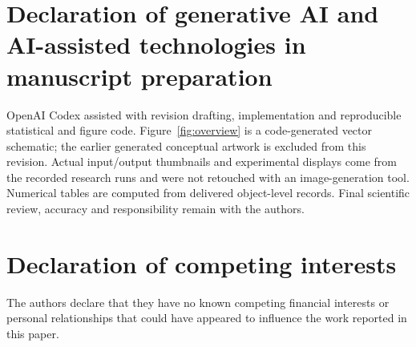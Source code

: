 \documentclass[times,twocolumn,final]{elsarticle}
\providecommand{\DIFadd}[1]{{\protect\color{blue} \sf #1}} %
\providecommand{\DIFaddend}{} %
\begin{document}
\section*{\DIFadd{Declaration of generative AI and AI-assisted technologies in manuscript preparation}}
\DIFadd{OpenAI Codex assisted with revision drafting, implementation and reproducible statistical and figure code. Figure~\ref{fig:overview} is a code-generated vector schematic; the earlier generated conceptual artwork is excluded from this revision. Actual input/output thumbnails and experimental displays come from the recorded research runs and were not retouched with an image-generation tool. Numerical tables are computed from delivered object-level records. Final scientific review, accuracy and responsibility remain with the authors}\DIFaddend .

\section*{Declaration of competing interests}

The authors declare that they have no known competing financial interests or personal relationships that could have appeared to influence the work reported in this paper.
\end{document}
